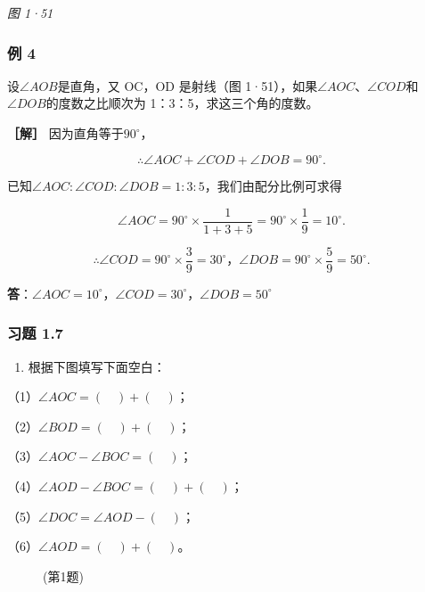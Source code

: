\emph{图 1·51}

\subsubsection{例 4}

设\(\angle AOB\)是直角，又 OC，OD 是射线（图
1·51），如果\(\angle AOC\)、\(\angle COD\)和\(\angle DOB\)的度数之比顺次为
1：3：5，求这三个角的度数。

\textbf{［解］} 因为直角等于\(90^{\circ}\)，

\[
\therefore \angle AOC + \angle COD + \angle DOB = 90 ^{\circ}.
\]

已知\(\angle AOC: \angle COD: \angle DOB = 1:3:5\)，我们由配分比例可求得

\[
\angle AOC = 90 ^{\circ} \times \frac{1}{1 + 3 + 5} = 90 ^{\circ} \times \frac{1}{9} = 10 ^{\circ}.
\]

\[
\therefore \angle COD = 90 ^{\circ} \times \frac{3}{9} = 30 ^{\circ}\text{，} \angle DOB = 90 ^{\circ} \times \frac{5}{9} = 50 ^{\circ}.
\]

\textbf{答}：\(\angle AOC = 10^{\circ}\)，\(\angle COD = 30^{\circ}\)，\(\angle DOB = 50^{\circ}\)

\subsubsection{习题 1.7}

\begin{enumerate}
\item
  根据下图填写下面空白：
\end{enumerate}

（1）\(\angle AOC = (\quad) + (\quad)\)；

（2）\(\angle BOD = (\quad) + (\quad)\)；

（3）\(\angle AOC - \angle BOC = (\quad)\)；

（4）\(\angle AOD - \angle BOC = (\quad) + (\quad)\)；

（5）\(\angle DOC = \angle AOD - (\quad)\)；

（6）\(\angle AOD = (\quad) + (\quad)\)。

\begin{figure}
\centering
{}
\caption{(第1题)}
\end{figure}

